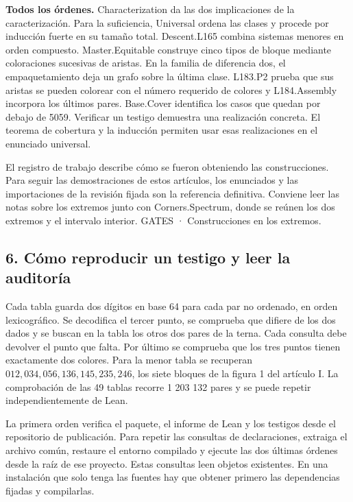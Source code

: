 \documentclass[spanish,11pt,a4paper]{article}
\begin{document}
\textbf{Todos los órdenes.} Characterization da las dos implicaciones de la caracterización. Para la suficiencia, Universal ordena las clases y procede por inducción fuerte en su tamaño total. Descent.L165 combina sistemas menores en orden compuesto. Master.Equitable construye cinco tipos de bloque mediante coloraciones sucesivas de aristas. En la familia de diferencia dos, el empaquetamiento deja un grafo sobre la última clase. L183.P2 prueba que sus aristas se pueden colorear con el número requerido de colores y L184.Assembly incorpora los últimos pares. Base.Cover identifica los casos que quedan por debajo de 5059. Verificar un testigo demuestra una realización concreta. El teorema de cobertura y la inducción permiten usar esas realizaciones en el enunciado universal.

El registro de trabajo describe cómo se fueron obteniendo las construcciones. Para seguir las demostraciones de estos artículos, los enunciados y las importaciones de la revisión fijada son la referencia definitiva. Conviene leer las notas sobre los extremos junto con Corners.Spectrum, donde se reúnen los dos extremos y el intervalo interior. GATES · Construcciones en los extremos.

\subsection{6. Cómo reproducir un testigo y leer la auditoría}\label{cuxf3mo-reproducir-un-testigo-y-leer-la-auditoruxeda}

Cada tabla guarda dos dígitos en base 64 para cada par no ordenado, en orden lexicográfico. Se decodifica el tercer punto, se comprueba que difiere de los dos dados y se buscan en la tabla los otros dos pares de la terna. Cada consulta debe devolver el punto que falta. Por último se comprueba que los tres puntos tienen exactamente dos colores. Para la menor tabla se recuperan \(012,034,056,136,145,235,246\), los siete bloques de la figura 1 del artículo I. La comprobación de las 49 tablas recorre 1 203 132 pares y se puede repetir independientemente de Lean.

La primera orden verifica el paquete, el informe de Lean y los testigos desde el repositorio de publicación. Para repetir las consultas de declaraciones, extraiga el archivo común, restaure el entorno compilado y ejecute las dos últimas órdenes desde la raíz de ese proyecto. Estas consultas leen objetos existentes. En una instalación que solo tenga las fuentes hay que obtener primero las dependencias fijadas y compilarlas.
\end{document}
